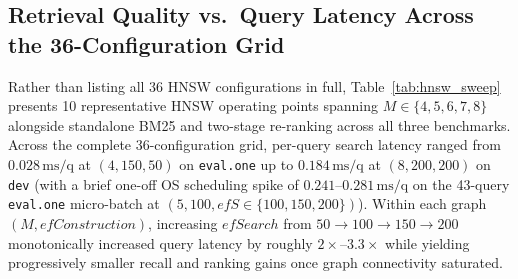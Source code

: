 \documentclass[11pt]{article}
\begin{document}
\subsection{Retrieval Quality vs.\ Query Latency Across the 36-Configuration Grid}
Rather than listing all 36 HNSW configurations in full, Table~\ref{tab:hnsw_sweep} presents 10 representative HNSW operating points spanning $M \in \{4, 5, 6, 7, 8\}$ alongside standalone BM25 and two-stage re-ranking across all three benchmarks. Across the complete 36-configuration grid, per-query search latency ranged from $0.028\,\text{ms/q}$ at $(4, 150, 50)$ on \texttt{eval.one} up to $0.184\,\text{ms/q}$ at $(8, 200, 200)$ on \texttt{dev} (with a brief one-off OS scheduling spike of $0.241$--$0.281\,\text{ms/q}$ on the 43-query \texttt{eval.one} micro-batch at $(5, 100, \mathit{efS} \in \{100, 150, 200\})$). Within each graph $(M, \mathit{efConstruction})$, increasing $\mathit{efSearch}$ from $50 \to 100 \to 150 \to 200$ monotonically increased query latency by roughly $2\times$--$3.3\times$ while yielding progressively smaller recall and ranking gains once graph connectivity saturated.
\end{document}
